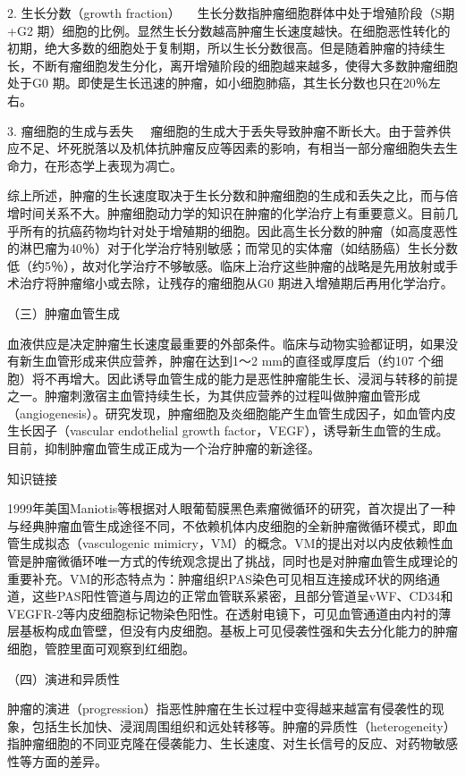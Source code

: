 {2. 生长分数（growth fraction）}
　生长分数指肿瘤细胞群体中处于增殖阶段（S期+G{2}
期）细胞的比例。显然生长分数越高肿瘤生长速度越快。在细胞恶性转化的初期，绝大多数的细胞处于复制期，所以生长分数很高。但是随着肿瘤的持续生长，不断有瘤细胞发生分化，离开增殖阶段的细胞越来越多，使得大多数肿瘤细胞处于G{0}
期。即使是生长迅速的肿瘤，如小细胞肺癌，其生长分数也只在20％左右。

{3. 瘤细胞的生成与丢失}
　瘤细胞的生成大于丢失导致肿瘤不断长大。由于营养供应不足、坏死脱落以及机体抗肿瘤反应等因素的影响，有相当一部分瘤细胞失去生命力，在形态学上表现为凋亡。

综上所述，肿瘤的生长速度取决于生长分数和肿瘤细胞的生成和丢失之比，而与倍增时间关系不大。肿瘤细胞动力学的知识在肿瘤的化学治疗上有重要意义。目前几乎所有的抗癌药物均针对处于增殖期的细胞。因此高生长分数的肿瘤（如高度恶性的淋巴瘤为40％）对于化学治疗特别敏感；而常见的实体瘤（如结肠癌）生长分数低（约5％），故对化学治疗不够敏感。临床上治疗这些肿瘤的战略是先用放射或手术治疗将肿瘤缩小或去除，让残存的瘤细胞从G{0}
期进入增殖期后再用化学治疗。

{（三）肿瘤血管生成}

血液供应是决定肿瘤生长速度最重要的外部条件。临床与动物实验都证明，如果没有新生血管形成来供应营养，肿瘤在达到1～2
mm的直径或厚度后（约10{7}
个细胞）将不再增大。因此诱导血管生成的能力是恶性肿瘤能生长、浸润与转移的前提之一。肿瘤刺激宿主血管持续生长，为其供应营养的过程叫做肿瘤血管形成（angiogenesis）。研究发现，肿瘤细胞及炎细胞能产生血管生成因子，如血管内皮生长因子（vascular
endothelial growth
factor，VEGF），诱导新生血管的生成。目前，抑制肿瘤血管生成正成为一个治疗肿瘤的新途径。

{知识链接}

1999年美国Maniotis等根据对人眼葡萄膜黑色素瘤微循环的研究，首次提出了一种与经典肿瘤血管生成途径不同，不依赖机体内皮细胞的全新肿瘤微循环模式，即血管生成拟态（vasculogenic
mimicry，VM）的概念。VM的提出对以内皮依赖性血管是肿瘤微循环唯一方式的传统观念提出了挑战，同时也是对肿瘤血管生成理论的重要补充。VM的形态特点为：肿瘤组织PAS染色可见相互连接成环状的网络通道，这些PAS阳性管道与周边的正常血管联系紧密，且部分管道呈vWF、CD34和VEGFR-2等内皮细胞标记物染色阳性。在透射电镜下，可见血管通道由内衬的薄层基板构成血管壁，但没有内皮细胞。基板上可见侵袭性强和失去分化能力的肿瘤细胞，管腔里面可观察到红细胞。

{（四）演进和异质性}

肿瘤的演进（progression）指恶性肿瘤在生长过程中变得越来越富有侵袭性的现象，包括生长加快、浸润周围组织和远处转移等。肿瘤的异质性（heterogeneity）指肿瘤细胞的不同亚克隆在侵袭能力、生长速度、对生长信号的反应、对药物敏感性等方面的差异。

